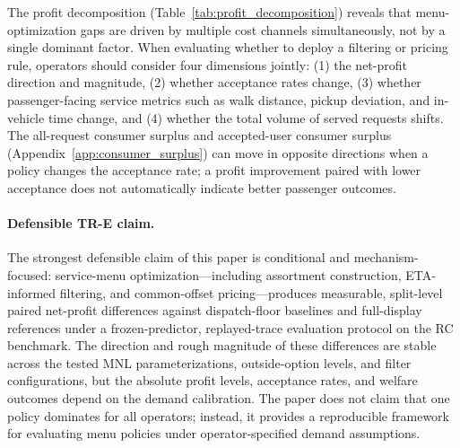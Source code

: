 The profit decomposition (Table~\ref{tab:profit_decomposition}) reveals that menu-optimization gaps are driven by multiple cost channels simultaneously, not by a single dominant factor. When evaluating whether to deploy a filtering or pricing rule, operators should consider four dimensions jointly: (1) the net-profit direction and magnitude, (2) whether acceptance rates change, (3) whether passenger-facing service metrics such as walk distance, pickup deviation, and in-vehicle time change, and (4) whether the total volume of served requests shifts. The all-request consumer surplus and accepted-user consumer surplus (Appendix~\ref{app:consumer_surplus}) can move in opposite directions when a policy changes the acceptance rate; a profit improvement paired with lower acceptance does not automatically indicate better passenger outcomes.

\paragraph{Defensible TR-E claim.}
The strongest defensible claim of this paper is conditional and mechanism-focused: service-menu optimization---including assortment construction, ETA-informed filtering, and common-offset pricing---produces measurable, split-level paired net-profit differences against dispatch-floor baselines and full-display references under a frozen-predictor, replayed-trace evaluation protocol on the RC benchmark. The direction and rough magnitude of these differences are stable across the tested MNL parameterizations, outside-option levels, and filter configurations, but the absolute profit levels, acceptance rates, and welfare outcomes depend on the demand calibration. The paper does not claim that one policy dominates for all operators; instead, it provides a reproducible framework for evaluating menu policies under operator-specified demand assumptions.
